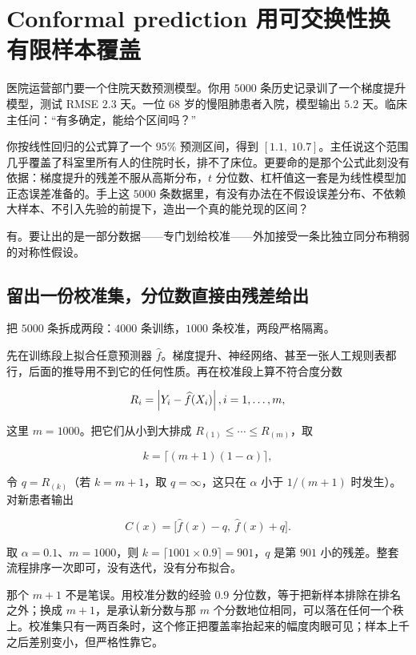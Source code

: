 \section{Conformal prediction 用可交换性换有限样本覆盖}
\label{sec:11-Mathematical-Statistics/07-Statistical-Decision-and-Reliable-Prediction/05}

医院运营部门要一个住院天数预测模型。你用 \(5000\) 条历史记录训了一个梯度提升模型，测试 RMSE \(2.3\) 天。一位 \(68\) 岁的慢阻肺患者入院，模型输出 \(5.2\) 天。临床主任问：``有多确定，能给个区间吗？''

你按线性回归的公式算了一个 \(95\%\) 预测区间，得到 \([1.1,\ 10.7]\)。主任说这个范围几乎覆盖了科室里所有人的住院时长，排不了床位。更要命的是那个公式此刻没有依据：梯度提升的残差不服从高斯分布，\(t\) 分位数、杠杆值这一套是为线性模型加正态误差准备的。手上这 \(5000\) 条数据里，有没有办法在不假设误差分布、不依赖大样本、不引入先验的前提下，造出一个真的能兑现的区间？

有。要让出的是一部分数据——专门划给校准——外加接受一条比独立同分布稍弱的对称性假设。

\subsection{留出一份校准集，分位数直接由残差给出}

把 \(5000\) 条拆成两段：\(4000\) 条训练，\(1000\) 条校准，两段严格隔离。

先在训练段上拟合任意预测器 \(\widehat f\)。梯度提升、神经网络、甚至一张人工规则表都行，后面的推导用不到它的任何性质。再在校准段上算不符合度分数

\[
R_i=\left|Y_i-\widehat f(X_i)\right|,\space i=1,\dots,m,
\]

这里 \(m=1000\)。把它们从小到大排成 \(R_{(1)}\le\cdots\le R_{(m)}\)，取

\[
k=\bigl\lceil (m+1)(1-\alpha)\bigr\rceil ,
\]

令 \(q=R_{(k)}\)（若 \(k=m+1\)，取 \(q=\infty\)，这只在 \(\alpha\) 小于 \(1/(m+1)\) 时发生）。对新患者输出

\[
C(x)=\bigl[\widehat f(x)-q,\ \widehat f(x)+q\bigr].
\]

取 \(\alpha=0.1\)、\(m=1000\)，则 \(k=\lceil 1001\times 0.9\rceil=901\)，\(q\) 是第 \(901\) 小的残差。整套流程排序一次即可，没有迭代，没有分布拟合。

那个 \(m+1\) 不是笔误。用校准分数的经验 \(0.9\) 分位数，等于把新样本排除在排名之外；换成 \(m+1\)，是承认新分数与那 \(m\) 个分数地位相同，可以落在任何一个秩上。校准集只有一两百条时，这个修正把覆盖率抬起来的幅度肉眼可见；样本上千之后差别变小，但严格性靠它。

